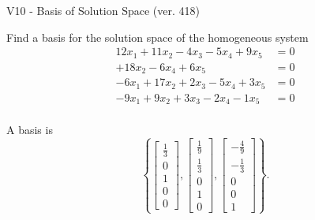 \begin{exercise}
  \begin{exerciseTitle}V10 - Basis of Solution Space (ver. 418)\end{exerciseTitle}
  \begin{exerciseStatement}
    Find a basis for the solution space of the homogeneous system 
\begin{align*}
 12 x_ 1 + 11 x_ 2 -4 x_ 3 -5 x_ 4 + 9 x_ 5 &= 0  \\ 
  + 18 x_ 2 -6 x_ 4 + 6 x_ 5 &= 0  \\ 
  -6 x_ 1 + 17 x_ 2 + 2 x_ 3 -5 x_ 4 + 3 x_ 5 &= 0  \\ 
  -9 x_ 1 + 9 x_ 2 + 3 x_ 3 -2 x_ 4 -1 x_ 5 &= 0  \\ 
 \end{align*}


 
  \end{exerciseStatement}

  \begin{exerciseAnswer}
   A basis is   
\[\left\{\left[\begin{array}{c}
\frac{1}{3} \\
0 \\
1 \\
0 \\
0
\end{array}\right] , \left[\begin{array}{c}
\frac{1}{9} \\
\frac{1}{3} \\
0 \\
1 \\
0
\end{array}\right] , \left[\begin{array}{c}
-\frac{4}{9} \\
-\frac{1}{3} \\
0 \\
0 \\
1
\end{array}\right]\right\}.\]

  


  \end{exerciseAnswer}
\end{exercise}